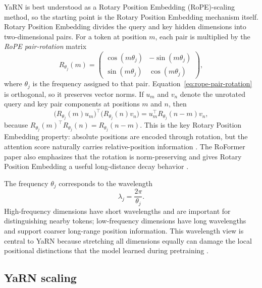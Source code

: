\documentclass[11pt]{article}
\begin{document}
YaRN is best understood as a Rotary Position Embedding (RoPE)-scaling method, so the starting point is the Rotary Position Embedding mechanism itself. Rotary Position Embedding divides the query and key hidden dimensions into two-dimensional pairs. For a token at position \(m\), each pair is multiplied by the \emph{RoPE pair-rotation} matrix \citep{su2021roformer}
\begin{equation}
\label{eq:rope-pair-rotation}
R_{\theta_j}(m)=
\begin{pmatrix}
\cos(m\theta_j) & -\sin(m\theta_j)\\
\sin(m\theta_j) & \cos(m\theta_j)
\end{pmatrix},
\end{equation}
where \(\theta_j\) is the frequency assigned to that pair. Equation~\eqref{eq:rope-pair-rotation} is orthogonal, so it preserves vector norms. If \(u_m\) and \(v_n\) denote the unrotated query and key pair components at positions \(m\) and \(n\), then
\begin{equation}
\label{eq:rope-relative-kernel}
\bigl(R_{\theta_j}(m)u_m\bigr)^{\top}\bigl(R_{\theta_j}(n)v_n\bigr)
=u_m^{\top}R_{\theta_j}(n-m)v_n,
\end{equation}
because \(R_{\theta_j}(m)^{\top}R_{\theta_j}(n)=R_{\theta_j}(n-m)\). This is the key Rotary Position Embedding property: absolute positions are encoded through rotation, but the attention score naturally carries relative-position information \citep{su2021roformer}. The RoFormer paper also emphasizes that the rotation is norm-preserving and gives Rotary Position Embedding a useful long-distance decay behavior \citep{su2021roformer}.

The frequency \(\theta_j\) corresponds to the wavelength
\begin{equation}
\label{eq:rope-wavelength}
\lambda_j=\frac{2\pi}{\theta_j}.
\end{equation}
High-frequency dimensions have short wavelengths and are important for distinguishing nearby tokens; low-frequency dimensions have long wavelengths and support coarser long-range position information. This wavelength view is central to YaRN because stretching all dimensions equally can damage the local positional distinctions that the model learned during pretraining \citep{peng2023yarn}.

\subsection{YaRN scaling}
\label{subsec:yarn-scaling}
\end{document}

